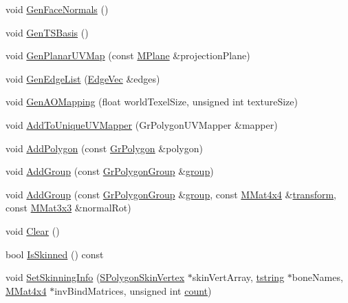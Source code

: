 \begin{CompactItemize}
\item 
void \hyperlink{class_gr_polygon_group_95956f1b189590a55244810b49610fe3}{GenFaceNormals} ()
\item 
void \hyperlink{class_gr_polygon_group_976f3a77c1696b3bc1b0797ad6d4e2ca}{GenTSBasis} ()
\item 
void \hyperlink{class_gr_polygon_group_bd4a96665b406a9694b87f950abc7b10}{GenPlanarUVMap} (const \hyperlink{class_m_plane}{MPlane} \&projectionPlane)
\item 
void \hyperlink{class_gr_polygon_group_a6fbc43f25738738b71f89be14c4de7a}{GenEdgeList} (\hyperlink{class_gr_polygon_group_8b3e2128f854d70f9d500ae00dafe5bd}{EdgeVec} \&edges)
\item 
void \hyperlink{class_gr_polygon_group_8f80c6de500f8d0bed5e3fcb676494ae}{GenAOMapping} (float worldTexelSize, unsigned int textureSize)
\item 
void \hyperlink{class_gr_polygon_group_364fa33e341e4462ccbb76061843ff4e}{AddToUniqueUVMapper} (GrPolygonUVMapper \&mapper)
\item 
void \hyperlink{class_gr_polygon_group_2f06fcddd6fd04a28b8ae8682a36d508}{AddPolygon} (const \hyperlink{class_gr_polygon}{GrPolygon} \&polygon)
\item 
void \hyperlink{class_gr_polygon_group_3a7869b9ff3ae864be0aa71efcca2def}{AddGroup} (const \hyperlink{class_gr_polygon_group}{GrPolygonGroup} \&\hyperlink{wglext_8h_69cec9b28d037f2272131b4fcd148620}{group})
\item 
void \hyperlink{class_gr_polygon_group_852fd667f43f1ceabf80ceb8d86168d6}{AddGroup} (const \hyperlink{class_gr_polygon_group}{GrPolygonGroup} \&\hyperlink{wglext_8h_69cec9b28d037f2272131b4fcd148620}{group}, const \hyperlink{class_m_mat4x4}{MMat4x4} \&\hyperlink{glext__bak_8h_07993c0d92c1aeeb357ba0495c8b5325}{transform}, const \hyperlink{class_m_mat3x3}{MMat3x3} \&normalRot)
\item 
void \hyperlink{class_gr_polygon_group_a3bcc378c3f94203ec19e897361ae164}{Clear} ()
\item 
bool \hyperlink{class_gr_polygon_group_021374f6a34f0df6d401a8bcfde8c30b}{IsSkinned} () const 
\item 
void \hyperlink{class_gr_polygon_group_04f5e9959c34e61726e25ff80d120989}{SetSkinningInfo} (\hyperlink{struct_s_polygon_skin_vertex}{SPolygonSkinVertex} $\ast$skinVertArray, \hyperlink{common__afx_8h_816fa58fd77499b0edb2c69ebe803d5c}{tstring} $\ast$boneNames, \hyperlink{class_m_mat4x4}{MMat4x4} $\ast$invBindMatrices, unsigned int \hyperlink{wglext_8h_98d18d6b4e3ba4ed266c6fb54c839d70}{count})

\end{CompactItemize}
